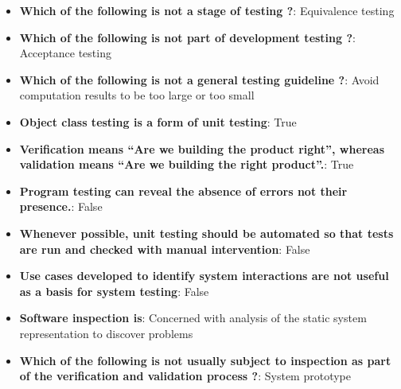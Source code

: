 \documentclass{report}
\begin{document}
    \pagebreak 
    \begin{itemize}
        \item \textbf{Which of the following is not a stage of testing ?}: Equivalence testing
        \item \textbf{Which of the following is not part of development testing ?}: Acceptance testing
        \item \textbf{Which of the following is not a general testing guideline ?}: Avoid computation results to be too large or too small
        \item \textbf{Object class testing is a form of unit testing}: True
        \item \textbf{Verification means “Are we building the product right”, whereas validation means “Are we building the right product”.}: True
        \item \textbf{Program testing can reveal the absence of errors not their presence.}: False
        \item \textbf{Whenever possible, unit testing should be automated so that tests are run and checked with manual intervention}: False
        \item \textbf{Use cases developed to identify system interactions are not useful as a basis for system testing}: False
        \item \textbf{Software inspection is}: Concerned with analysis of the static system representation to discover problems
        \item \textbf{Which of the following is not usually subject to inspection as part of the verification and validation process ?}: System prototype
    \end{itemize}
    
\end{document}
